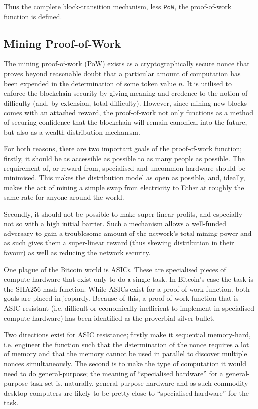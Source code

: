 \documentclass[9pt,oneside]{amsart}
\begin{document}
\begin{multicols}{2}
Thus the complete block-transition mechanism, less $\mathtt{PoW}$, the proof-of-work function is defined.

\subsection{Mining Proof-of-Work} \label{ch:pow}

The mining proof-of-work (PoW) exists as a cryptographically secure nonce that proves beyond reasonable doubt that a particular amount of computation has been expended in the determination of some token value $n$. It is utilised to enforce the blockchain security by giving meaning and credence to the notion of difficulty (and, by extension, total difficulty). However, since mining new blocks comes with an attached reward, the proof-of-work not only functions as a method of securing confidence that the blockchain will remain canonical into the future, but also as a wealth distribution mechanism.

For both reasons, there are two important goals of the proof-of-work function; firstly, it should be as accessible as possible to as many people as possible. The requirement of, or reward from, specialised and uncommon hardware should be minimised. This makes the distribution model as open as possible, and, ideally, makes the act of mining a simple swap from electricity to Ether at roughly the same rate for anyone around the world.

Secondly, it should not be possible to make super-linear profits, and especially not so with a high initial barrier. Such a mechanism allows a well-funded adversary to gain a troublesome amount of the network's total mining power and as such gives them a super-linear reward (thus skewing distribution in their favour) as well as reducing the network security.

One plague of the Bitcoin world is ASICs. These are specialised pieces of compute hardware that exist only to do a single task. In Bitcoin's case the task is the SHA256 hash function. While ASICs exist for a proof-of-work function, both goals are placed in jeopardy. Because of this, a proof-of-work function that is ASIC-resistant (i.e. difficult or economically inefficient to implement in specialised compute hardware) has been identified as the proverbial silver bullet.

Two directions exist for ASIC resistance; firstly make it sequential memory-hard, i.e. engineer the function such that the determination of the nonce requires a lot of memory and that the memory cannot be used in parallel to discover multiple nonces simultaneously. The second is to make the type of computation it would need to do general-purpose; the meaning of ``specialised hardware''  for a general-purpose task set is, naturally, general purpose hardware and as such commodity desktop computers are likely to be pretty close to ``specialised hardware'' for the task.


\end{multicols}
\end{document}
